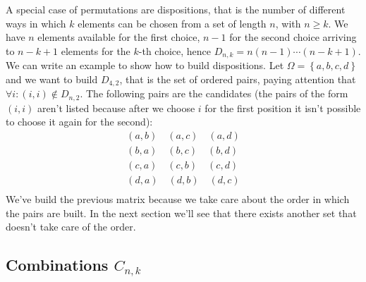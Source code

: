 A special case of permutations are dispositions, that is the number of
different ways in which $k$ elements can be chosen from a set of
length $n$, with $n \geq k$. We have $n$ elements available for the
first choice, $n-1$ for the second choice arriving to $n-k+1$ elements
for the $k$-th choice, hence $D_{n,k} = n(n-1)\cdots(n-k+1)$.  We can
write an example to show how to build dispositions. Let $\Omega =
\left \lbrace a,b,c, d\right\rbrace $ and we want to build $D_{4,2}$,
that is the set of ordered pairs, paying attention that $ \forall i:
(i,i)\not \in D_{n,2}$. The following pairs are the candidates (the
pairs of the form $(i,i)$ aren't listed because after we choose $i$
for the first position it isn't possible to choose it again for the
second):
\begin{displaymath}
  \begin{split}
    \left ( a, b \right)\quad
    \left ( a, c \right)\quad
    \left ( a, d \right)\\
    \left ( b, a \right)\quad
    \left ( b, c \right)\quad
    \left ( b, d \right)\\
    \left ( c, a \right)\quad
    \left ( c, b \right)\quad
    \left ( c, d \right)\\
    \left ( d, a \right)\quad
    \left ( d, b \right)\quad
    \left ( d, c \right)\\
  \end{split}
\end{displaymath}
We've build the previous matrix because we take care about
the order in which the pairs are built. In the next section we'll see
that there exists another set that doesn't take care of the order.

\subsection{Combinations $C_{n,k}$}

